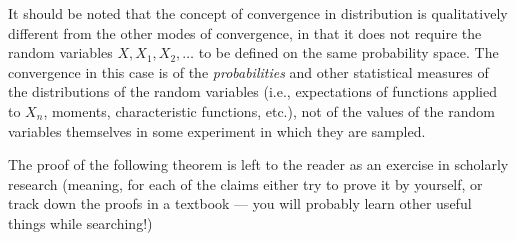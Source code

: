 \documentclass[11pt]{report}
\theoremstyle{plain}
\theoremstyle{definition}
\begin{document}
\noindent It should be noted that the concept of convergence in
distribution is qualitatively different from the other
modes of convergence, in that it does not require the
random variables $X, X_1, X_2, \ldots$ to be defined
on the same probability space. The convergence in this
case is of the \emph{probabilities} and other statistical
measures of the distributions of the random variables
(i.e., expectations of functions applied to $X_n$,
moments, characteristic functions, etc.), not of the
values of the random variables themselves in some
experiment in which they are sampled.

The proof of the following theorem is left to the
reader as an exercise in scholarly research (meaning,
for each of the claims either try to prove it by
yourself, or track down the proofs in a textbook ---
you will probably learn other useful things while
searching!)
\end{document}
